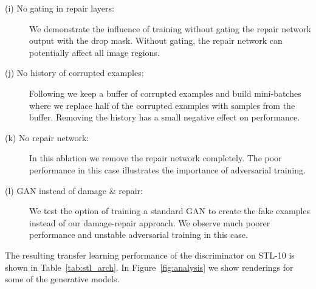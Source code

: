 \documentclass[10pt,twocolumn,letterpaper]{article}
\begin{document}
\begin{description}
	\item [(i) No gating in repair layers:] We demonstrate the influence of training without gating the repair network output with the drop mask. Without gating, the repair network can potentially affect all image regions. 
	\item [(j) No history of corrupted examples:] Following \cite{shrivastava2016learning} we keep a buffer of corrupted examples and build mini-batches where we replace half of the corrupted examples with samples from the buffer. Removing the history has a small negative effect on performance.
	\item [(k) No repair network:] In this ablation we remove the repair network completely. The poor performance in this case illustrates the importance of adversarial training. 
	\item [(l) GAN instead of damage \& repair:] We test the option of training a standard GAN to create the fake examples instead of our damage-repair approach. We observe much poorer performance and unstable adversarial training in this case.  
\end{description}

The resulting transfer learning performance of the discriminator on STL-10 is shown in Table~\ref{tab:stl_arch}. In Figure~\ref{fig:analysis} we show renderings for some of the generative models. 
\end{document}
